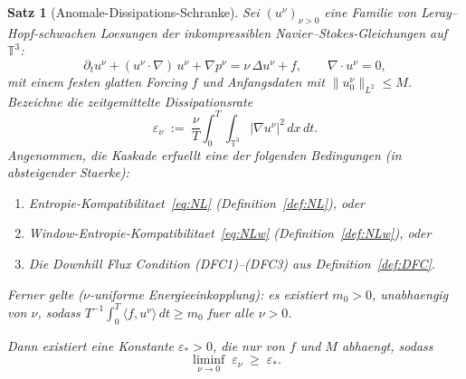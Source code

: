 \documentclass[12pt,a4paper]{article}
\theoremstyle{definition}
\theoremstyle{plain}
\newtheorem{theorem}[definition]{Satz}
\theoremstyle{remark}
\begin{document}
\begin{theorem}[Anomale-Dissipations-Schranke]\label{thm:anomalous}
Sei $(u^\nu)_{\nu > 0}$ eine Familie von Leray--Hopf-schwachen Loesungen
der inkompressiblen Navier--Stokes-Gleichungen auf $\mathbb{T}^3$:
\begin{equation}\label{eq:NSE}
  \partial_t u^\nu + (u^\nu \cdot \nabla)\,u^\nu
  + \nabla p^\nu
  = \nu\,\Delta u^\nu + f,
  \qquad \nabla \cdot u^\nu = 0,
\end{equation}
mit einem festen glatten Forcing $f$ und Anfangsdaten mit
$\|u^\nu_0\|_{L^2} \le M$. Bezeichne die zeitgemittelte Dissipationsrate
\begin{equation}\label{eq:diss}
  \varepsilon_\nu
  \;:=\;
  \frac{\nu}{T} \int_0^T \!\!\int_{\mathbb{T}^3}
    |\nabla u^\nu|^2 \,dx\,dt.
\end{equation}
Angenommen, die Kaskade erfuellt \emph{eine} der folgenden Bedingungen
(in absteigender Staerke):
\begin{enumerate}
  \item[\textup{(H1)}] Entropie-Kompatibilitaet~\eqref{eq:NL}
    (Definition~\ref{def:NL}), oder
  \item[\textup{(H2)}] Window-Entropie-Kompatibilitaet~\eqref{eq:NLw}
    (Definition~\ref{def:NLw}), oder
  \item[\textup{(H3)}] Die Downhill Flux Condition
    \textup{(DFC1)--(DFC3)} aus Definition~\ref{def:DFC}.
\end{enumerate}
Ferner gelte \textup{($\nu$-uniforme Energieeinkopplung)}:
es existiert $m_0 > 0$, unabhaengig von $\nu$, sodass
$T^{-1}\int_0^T \langle f, u^\nu \rangle\,dt \ge m_0$
fuer alle $\nu > 0$.

Dann existiert eine Konstante $\varepsilon_* > 0$, die nur von $f$
und $M$ abhaengt, sodass
\begin{equation}\label{eq:anomalous}
  \liminf_{\nu \to 0}\; \varepsilon_\nu
  \;\ge\; \varepsilon_*.
\end{equation}
\end{theorem}
\end{document}
